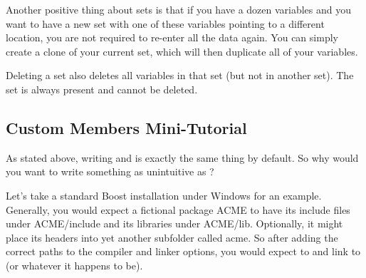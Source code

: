 Another positive thing about sets is that if you have a dozen variables and you want to have a new set with one of these variables pointing to a different location, you are not required to re-enter all the data again. You can simply create a clone of your current set, which will then duplicate all of your variables.

Deleting a set also deletes all variables in that set (but not in another set). The  set is always present and cannot be deleted.

\subsection{Custom Members Mini-Tutorial}\label{sec:mini_tutorial}

As stated above, writing  and  is exactly the same thing by default. So why would you want to write something as unintuitive as ?

Let's take a standard Boost installation under Windows for an example. Generally, you would expect a fictional package ACME to have its include files under ACME/include and its libraries under ACME/lib. Optionally, it might place its headers into yet another subfolder called acme. So after adding the correct paths to the compiler and linker options, you would expect to  and link to  (or whatever it happens to be).

%
